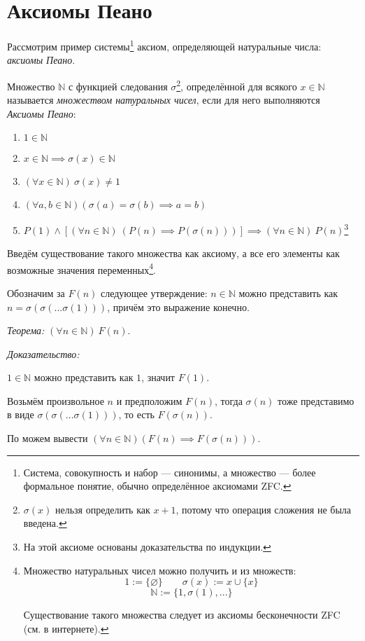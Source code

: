 \section{Аксиомы Пеано}

Рассмотрим пример системы\footnote{
	Система, совокупность и набор --- синонимы, а множество --- более формальное
	понятие, обычно определённое аксиомами ZFC.
} аксиом, определяющей натуральные числа: {\it аксиомы Пеано}.

\newcommand\N{\mathbb{N}}
Множество $\N$ с функцией следования $\sigma$\footnote{$\sigma(x)$ нельзя определить
	как $x+1$, потому что операция сложения не была введена.},
определённой для всякого $x\in\N$
называется {\it множеством натуральных чисел}, если для него
выполняются {\it Аксиомы Пеано}:
\begin{enumerate}
	\item{}$1\in \N$
	\item{}$x\in\N\implies \sigma(x)\in\N$
	\item{}$(\forall x\in\N)~\sigma(x)\neq 1$
	\item{}$(\forall a,b\in\N)(\sigma(a)=\sigma(b)\implies a=b)$
	\item{}$P(1)\land [(\forall n\in\N)~(P(n)\implies P(\sigma(n)))]
		\implies(\forall n\in\N)~P(n)$\footnote{На этой аксиоме основаны
		доказательства по индукции.}
\end{enumerate}

\pagebreak

Введём существование такого множества как аксиому, а
все его элементы как
возможные значения переменных\footnote{Множество натуральных чисел можно
	получить и из множеств:
	\[
		1:=\{\varnothing\}\qquad\sigma(x):=x\cup \{x\}
	\]
	\[
		\N:=\{1,\sigma(1),...\}
	\]

	Существование такого множества следует из
	аксиомы бесконечности ZFC (см. в интернете).}.

Обозначим за $F(n)$ следующее утверждение: ${n\in\N}$ можно представить как
$n=\sigma(\sigma(...\sigma(1)))$, причём это выражение конечно.

{\it Теорема:} $(\forall n\in\N)~F(n)$.

	{\it Доказательство:}

$1\in\N$ можно представить как $1$, значит $F(1)$.

Возьмём произвольное $n$ и предположим $F(n)$, тогда $\sigma(n)$ тоже
представимо в виде $\sigma(\sigma(...\sigma(1)))$, то есть $F(\sigma(n))$.

По \Aii{} можем вывести $(\forall n\in\N)(F(n)\implies F(\sigma(n)))$.

